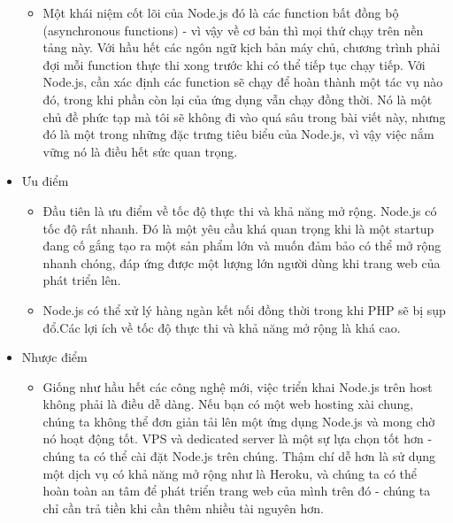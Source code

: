 \documentclass[12pt]{article}
\begin{document}
\begin{itemize}
\begin{itemize}
 \item Một khái niệm cốt lõi của Node.js đó là các function bất đồng bộ (asynchronous functions) - vì vậy về cơ bản thì mọi thứ chạy trên nền tảng này. Với hầu hết các ngôn ngữ kịch bản máy chủ, chương trình phải đợi mỗi function thực thi xong trước khi có thể tiếp tục chạy tiếp. Với Node.js, cần xác định các function sẽ chạy để hoàn thành một tác vụ nào đó, trong khi phần còn lại của ứng dụng vẫn chạy đồng thời. Nó là một chủ đề phức tạp mà tôi sẽ không đi vào quá sâu trong bài viết này, nhưng đó là một trong những đặc trưng tiêu biểu của Node.js, vì vậy việc nắm vững nó là điều hết sức quan trọng.
\end{itemize}
\item Ưu điểm
\begin{itemize}
 \item Đầu tiên là ưu điểm về tốc độ thực thi và khả năng mở rộng. Node.js có tốc độ rất nhanh. Đó là một yêu cầu khá quan trọng khi là một startup đang cố gắng tạo ra một sản phẩm lớn và muốn đảm bảo có thể mở rộng nhanh chóng, đáp ứng được một lượng lớn người dùng khi trang web của phát triển lên. 
 \item Node.js có thể xử lý hàng ngàn kết nối đồng thời trong khi PHP sẽ bị sụp đổ.Các lợi ích về tốc độ thực thi và khả năng mở rộng là khá cao.
\end{itemize}
\item Nhược  điểm
\begin{itemize}
 \item Giống như hầu hết các công nghệ mới, việc triển khai Node.js trên host không phải là điều dễ dàng. Nếu bạn có một web hosting xài chung, chúng ta không thể đơn giản tải lên một ứng dụng Node.js và mong chờ nó hoạt động tốt. VPS và dedicated server là một sự lựa chọn tốt hơn - chúng ta có thể cài đặt Node.js trên chúng. Thậm chí dễ hơn là sử dụng một dịch vụ có khả năng mở rộng như là Heroku, và chúng ta có thể hoàn toàn an tâm để phát triển trang web của mình trên đó - chúng ta chỉ cần trả tiền khi cần thêm nhiều tài nguyên hơn.
\end{itemize}
\end{itemize}
\end{document}
